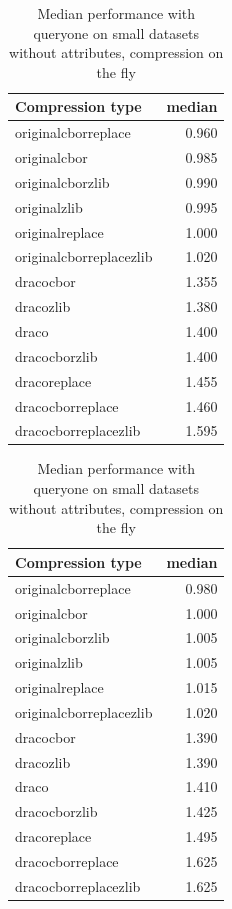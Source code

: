\begin{table}[!h]
    \begin{minipage}{.5\linewidth}
      \caption{
Median performance with queryone on small datasets, compression on the fly}
\centering

\begin{tabular}{|l|r|}
\hline
Compression type & median\\
\hline
originalcborreplace & 0.960\\
\hline
originalcbor & 0.985\\
\hline
originalcborzlib & 0.990\\
\hline
originalzlib & 0.995\\
\hline
originalreplace & 1.000\\
\hline
originalcborreplacezlib & 1.020\\
\hline
dracocbor & 1.355\\
\hline
dracozlib & 1.380\\
\hline
draco & 1.400\\
\hline
dracocborzlib & 1.400\\
\hline
dracoreplace & 1.455\\
\hline
dracocborreplace & 1.460\\
\hline
dracocborreplacezlib & 1.595\\
\hline
\end{tabular}
\end{minipage}%
    \begin{minipage}{.5\linewidth}
      \centering
        \caption{
Median performance with queryone on small datasets without attributes, compression on the fly}

\begin{tabular}{|l|r|}
\hline
Compression type & median\\
\hline
originalcborreplace & 0.980\\
\hline
originalcbor & 1.000\\
\hline
originalcborzlib & 1.005\\
\hline
originalzlib & 1.005\\
\hline
originalreplace & 1.015\\
\hline
originalcborreplacezlib & 1.020\\
\hline
dracocbor & 1.390\\
\hline
dracozlib & 1.390\\
\hline
draco & 1.410\\
\hline
dracocborzlib & 1.425\\
\hline
dracoreplace & 1.495\\
\hline
dracocborreplace & 1.625\\
\hline
dracocborreplacezlib & 1.625\\
\hline
\end{tabular}
\end{minipage} 
\end{table}





